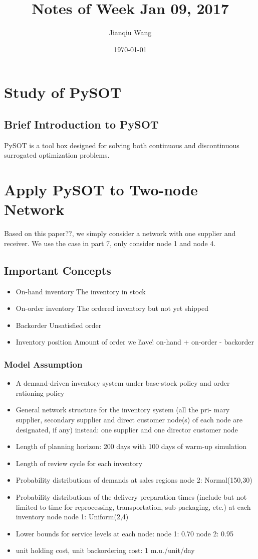 \documentclass[letterpaper]{article}
\begin{document}
\title{ Notes of Week Jan 09, 2017}
\author{Jianqiu Wang}
\date{\today}
\maketitle
\section{Study of PySOT}
\subsection{Brief Introduction to PySOT}
PySOT is a tool box designed for solving both continuous and discontinuous surrogated optimization problems.
\section{Apply PySOT to Two-node Network}
Based on this paper??, we simply consider a network with one supplier and receiver. We use the case in part 7, only consider node 1 and node 4.
\subsection{Important Concepts}
\begin{itemize}
\item{On-hand inventory} The inventory in stock
\item{On-order inventory} The ordered inventory but not yet shipped
\item{Backorder} Unsatisfied order
\item{Inventory position} Amount of order we \'have\': on-hand + on-order - backorder
\end{itemize}

\subsubsection{Model Assumption}
\begin{itemize}
\item A demand-driven inventory system under base-stock policy and order rationing policy
\item General network structure for the inventory system (all the pri- mary supplier, secondary supplier and direct customer node(s) of each node are designated, if any)
instead: one supplier and one director customer node
\item Length of planning horizon: 200 days with 100 days of warm-up simulation
\item Length of review cycle for each inventory
\item Probability distributions of demands at sales regions
node 2: Normal(150,30)
\item Probability distributions of the delivery preparation times
(include but not limited to time for reprocessing, transportation,
sub-packaging, etc.) at each inventory node 
node 1: Uniform(2,4) 
\item Lower bounds for service levels at each node:
node 1: 0.70
node 2: 0.95
\item unit holding cost, unit backordering cost: 1 m.u./unit/day
\end{itemize}
\end{document}
